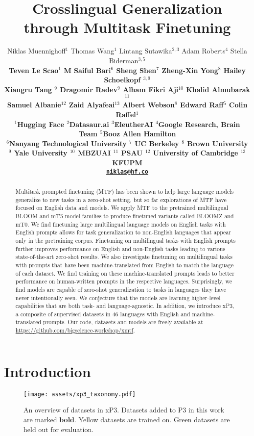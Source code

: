 \documentclass[11pt]{article}
\title{Crosslingual Generalization through Multitask Finetuning}
\author{
Niklas Muennighoff$^{1}$
\quad Thomas Wang$^1$ 
\quad Lintang Sutawika$^{2,3}$ 
\quad Adam Roberts$^4$
\quad Stella Biderman$^{3,5}$\\
\bf \quad Teven Le Scao$^1$
\bf \quad M Saiful Bari$^6$ 
\bf \quad Sheng Shen$^7$ 
\bf \quad Zheng-Xin Yong$^8$
\bf \quad Hailey Schoelkopf $^{3,9}$\\
\bf \quad Xiangru Tang $^9$ 
\bf \quad Dragomir Radev$^9$ 
\bf \quad Alham Fikri Aji$^{10}$
\bf \quad Khalid Almubarak$^{11}$\\
\bf \quad Samuel Albanie$^{12}$
\bf \quad Zaid Alyafeai$^{13}$
\bf \quad Albert Webson$^8$
\bf \quad Edward Raff$^{5}$
\bf \quad Colin Raffel$^1$ \\
  $^1$Hugging Face \quad
  $^2$Datasaur.ai \quad
  $^3$EleutherAI \quad
  $^4$Google Research, Brain Team \quad
  $^5$Booz Allen Hamilton \quad\\
  $^6$Nanyang Technological University \quad
  $^7$ UC Berkeley \quad
  $^8$ Brown University \quad \\
  $^9$ Yale University \quad
  $^{10}$ MBZUAI \quad  
  $^{11}$ PSAU \quad
  $^{12}$ University of Cambridge 
  $^{13}$ KFUPM\\
  {\tt \href{mailto:niklas@hf.co}{niklas@hf.co}}
}
\begin{document}
\maketitle
\begin{abstract}

Multitask prompted finetuning (MTF) has been shown to help large language models generalize to new tasks in a zero-shot setting, but so far explorations of MTF have focused on English data and models. We apply MTF to the pretrained multilingual BLOOM and mT5 model families to produce finetuned variants called BLOOMZ and mT0. We find finetuning large multilingual language models on English tasks with English prompts allows for task generalization to non-English languages that appear only in the pretraining corpus. Finetuning on multilingual tasks with English prompts further improves performance on English and non-English tasks leading to various state-of-the-art zero-shot results. We also investigate finetuning on multilingual tasks with prompts that have been machine-translated from English to match the language of each dataset. We find training on these machine-translated prompts leads to better performance on human-written prompts in the respective languages. Surprisingly, we find models are capable of zero-shot generalization to tasks in languages they have never intentionally seen. We conjecture that the models are learning higher-level capabilities that are both task- and language-agnostic. In addition, we introduce xP3, a composite of supervised datasets in 46 languages with English and machine-translated prompts. Our code, datasets and models are freely available at \url{https://github.com/bigscience-workshop/xmtf}.

\end{abstract}

\section{Introduction}

\begin{figure*}[ht]
    \centering
    \begin{center}
        \texttt{[image: assets/xp3\_taxonomy.pdf]}
        \caption{An overview of datasets in xP3. Datasets added to P3 in this work are marked \textbf{bold}. Yellow datasets are trained on. Green datasets are held out for evaluation.}
        \label{fig:xp3tasks}
    \end{center}
\end{figure*}
\end{document}
